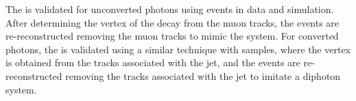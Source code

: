 The \VtxIdBdt is validated for unconverted photons using \Zmumu events in data and simulation. After determining the vertex of the decay from the muon tracks, the events are re-reconstructed removing the muon tracks to mimic the \Hgg system. For converted photons, the \VtxIdBdt is validated using a similar technique with \gammaJet samples, where the vertex is obtained from the tracks associated with the jet, and the events are re-reconstructed removing the tracks associated with the jet to imitate a diphoton system. %




